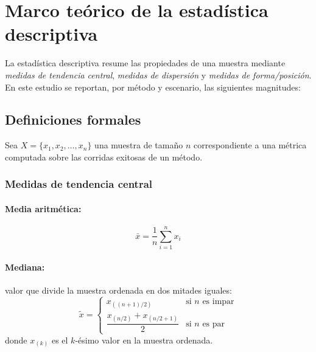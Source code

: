 \documentclass[12pt,a4paper,oneside]{book}
\begin{document}
\vspace{1em}



\section{Marco teórico de la estadística descriptiva}

La estadística descriptiva resume las propiedades de una muestra mediante \emph{medidas de tendencia central}, \emph{medidas de dispersión} y \emph{medidas de forma/posición}. En este estudio se reportan, por método y escenario, las siguientes magnitudes:

\subsection{Definiciones formales}

Sea $X = \{x_1, x_2, \ldots, x_n\}$ una muestra de tamaño $n$ correspondiente a una métrica computada sobre las corridas exitosas de un método.

\subsubsection{Medidas de tendencia central}

\paragraph{Media aritmética:}
\begin{equation}
\bar{x} = \frac{1}{n}\sum_{i=1}^{n} x_i
\end{equation}

\paragraph{Mediana:} valor que divide la muestra ordenada en dos mitades iguales:
\begin{equation}
\tilde{x} = \begin{cases}
x_{((n+1)/2)} & \text{si } n \text{ es impar}\\
\dfrac{x_{(n/2)} + x_{(n/2+1)}}{2} & \text{si } n \text{ es par}
\end{cases}
\end{equation}
donde $x_{(k)}$ es el $k$-ésimo valor en la muestra ordenada.
\end{document}
